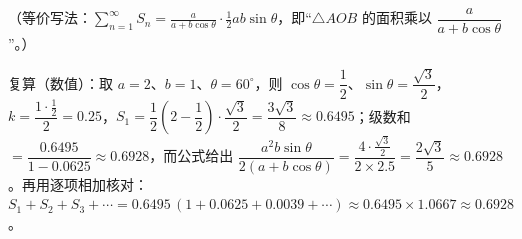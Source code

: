 \begin{answer}
（等价写法：$\displaystyle\sum_{n=1}^{\infty}S_n=\frac{a}{a+b\cos\theta}\cdot\frac12ab\sin\theta$，即“$\triangle AOB$ 的面积乘以 $\dfrac{a}{a+b\cos\theta}$”。）

复算（数值）：取 $a=2$、$b=1$、$\theta=60^\circ$，则 $\cos\theta=\dfrac12$、$\sin\theta=\dfrac{\sqrt3}{2}$，$k=\dfrac{1\cdot\frac12}{2}=0.25$，$S_1=\dfrac12\left(2-\dfrac12\right)\cdot\dfrac{\sqrt3}{2}=\dfrac{3\sqrt3}{8}\approx0.6495$；级数和 $=\dfrac{0.6495}{1-0.0625}\approx0.6928$，而公式给出 $\dfrac{a^2b\sin\theta}{2(a+b\cos\theta)}=\dfrac{4\cdot\frac{\sqrt3}{2}}{2\times2.5}=\dfrac{2\sqrt3}{5}\approx0.6928$ 。再用逐项相加核对：$S_1+S_2+S_3+\cdots=0.6495\,(1+0.0625+0.0039+\cdots)\approx0.6495\times1.0667\approx0.6928$ 。


\end{answer}